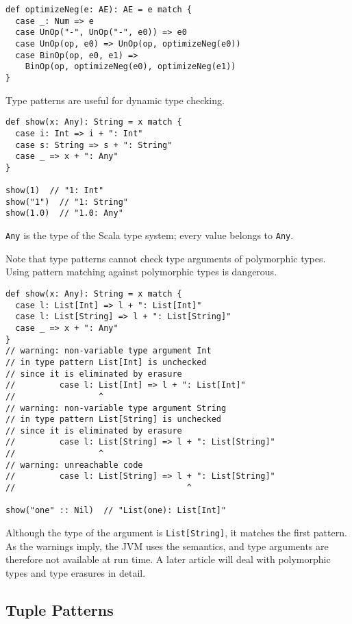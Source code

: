 \begin{verbatim}
def optimizeNeg(e: AE): AE = e match {
  case _: Num => e
  case UnOp("-", UnOp("-", e0)) => e0
  case UnOp(op, e0) => UnOp(op, optimizeNeg(e0))
  case BinOp(op, e0, e1) =>
    BinOp(op, optimizeNeg(e0), optimizeNeg(e1))
}
\end{verbatim}

Type patterns are useful for dynamic type checking.

\begin{verbatim}
def show(x: Any): String = x match {
  case i: Int => i + ": Int"
  case s: String => s + ": String"
  case _ => x + ": Any"
}

show(1)  // "1: Int"
show("1")  // "1: String"
show(1.0)  // "1.0: Any"
\end{verbatim}

\verb!Any! is the  type of the Scala type system; every value belongs
to \verb!Any!.

Note that type patterns cannot check type arguments of polymorphic types. Using
pattern matching against polymorphic types is dangerous.

\begin{verbatim}
def show(x: Any): String = x match {
  case l: List[Int] => l + ": List[Int]"
  case l: List[String] => l + ": List[String]"
  case _ => x + ": Any"
}
// warning: non-variable type argument Int
// in type pattern List[Int] is unchecked
// since it is eliminated by erasure
//         case l: List[Int] => l + ": List[Int]"
//                 ^
// warning: non-variable type argument String
// in type pattern List[String] is unchecked
// since it is eliminated by erasure
//         case l: List[String] => l + ": List[String]"
//                 ^
// warning: unreachable code
//         case l: List[String] => l + ": List[String]"
//                                   ^

show("one" :: Nil)  // "List(one): List[Int]"
\end{verbatim}

Although the type of the argument is \verb!List[String]!, it matches the first
pattern. As the warnings imply, the JVM uses the  
semantics, and type arguments are therefore not available at run time. A later
article will deal with polymorphic types and type erasures in detail.

\subsection{Tuple Patterns}

